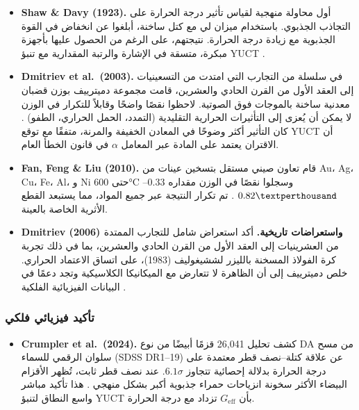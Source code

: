 \documentclass[11pt,a4paper]{article}
\begin{document}
	\begin{itemize}
		\item \textbf{Shaw \& Davy (1923).} أول محاولة منهجية لقياس تأثير درجة الحرارة على التجاذب الجذبوي. باستخدام ميزان لي مع كتل ساخنة، أبلغوا عن انخفاض في القوة الجذبوية مع زيادة درجة الحرارة. نتيجتهم، على الرغم من الحصول عليها بأجهزة مبكرة، متسقة في الإشارة والرتبة المقدارية مع تنبؤ YUCT \cite{ShawDavy1923}.
		
		\item \textbf{Dmitriev et al.\ (2003).} في سلسلة من التجارب التي امتدت من التسعينيات إلى العقد الأول من القرن الحادي والعشرين، قامت مجموعة دميترييف بوزن قضبان معدنية ساخنة بالموجات فوق الصوتية. لاحظوا نقصًا واضحًا وقابلاً للتكرار في الوزن لا يمكن أن يُعزى إلى التأثيرات الحرارية التقليدية (التمدد، الحمل الحراري، الطفو) \cite{Dmitriev2003}. كان التأثير أكثر وضوحًا في المعادن الخفيفة والمرنة، متفقًا مع توقع YUCT أن الاقتران يعتمد على المادة عبر المعامل $\alpha$ في قانون الخطأ العام.
		
		\item \textbf{Fan, Feng \& Liu (2010).} قام تعاون صيني مستقل بتسخين عينات من Au، Ag، Cu، Fe، Al، و Ni حتى 600°C وسجلوا نقصًا في الوزن مقداره $0.33$–$0.82\textperthousand$ \cite{Fan2010}. تم تكرار النتيجة عبر جميع المواد، مما يستبعد القطع الأثرية الخاصة بالعينة.
		
		\item \textbf{Dmitriev (2006) واستعراضات تاريخية.} أكد استعراض شامل للتجارب الممتدة من العشرينيات إلى العقد الأول من القرن الحادي والعشرين، بما في ذلك تجربة كرة الفولاذ المسخنة بالليزر لششيغوليف (1983)، على اتساق الاعتماد الحراري. خلص دميترييف إلى أن الظاهرة لا تتعارض مع الميكانيكا الكلاسيكية وتجد دعمًا في البيانات الفيزيائية الفلكية \cite{Dmitriev2006}.
	\end{itemize}
	
	\subsubsection*{تأكيد فيزيائي فلكي}
	
	\begin{itemize}
		\item \textbf{Crumpler et al.\ (2024).} كشف تحليل 26,041 قزمًا أبيضًا من نوع DA من مسح سلوان الرقمي للسماء (SDSS DR1–19) عن علاقة كتلة–نصف قطر معتمدة على درجة الحرارة بدلالة إحصائية تتجاوز $6.1\sigma$. عند نصف قطر ثابت، تُظهر الأقزام البيضاء الأكثر سخونة انزياحات حمراء جذبوية أكبر بشكل منهجي \cite{Crumpler2024}. هذا تأكيد مباشر واسع النطاق لتنبؤ YUCT بأن $G_{\mathrm{eff}}$ تزداد مع درجة الحرارة.
	\end{itemize}
	
\end{document}
